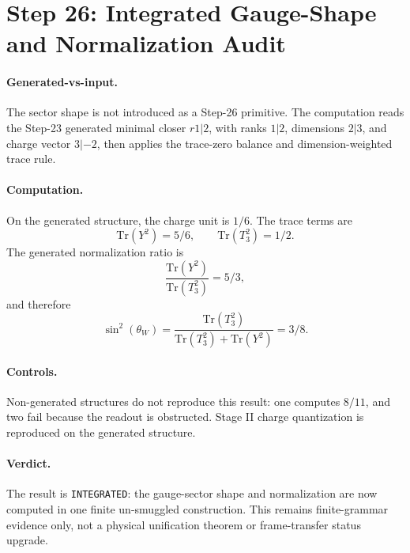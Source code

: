 \section{Step 26: Integrated Gauge-Shape and Normalization Audit}

\paragraph{Generated-vs-input.}
The sector shape is not introduced as a Step-26 primitive. The computation reads the Step-23 generated minimal closer \(r1|2\), with ranks \(1|2\), dimensions \(2|3\), and charge vector \(3|-2\), then applies the trace-zero balance and dimension-weighted trace rule.

\paragraph{Computation.}
On the generated structure, the charge unit is \(1/6\). The trace terms are
\[
\mathrm{Tr}(Y^2)=5/6,\qquad \mathrm{Tr}(T_3^2)=1/2.
\]
The generated normalization ratio is
\[
\frac{\mathrm{Tr}(Y^2)}{\mathrm{Tr}(T_3^2)}=5/3,
\]
and therefore
\[
\sin^2(\theta_W)=\frac{\mathrm{Tr}(T_3^2)}{\mathrm{Tr}(T_3^2)+\mathrm{Tr}(Y^2)}=3/8.
\]

\paragraph{Controls.}
Non-generated structures do not reproduce this result: one computes \(8/11\), and two fail because the readout is obstructed. Stage II charge quantization is reproduced on the generated structure.

\paragraph{Verdict.}
The result is \texttt{INTEGRATED}: the gauge-sector shape and normalization are now computed in one finite un-smuggled construction. This remains finite-grammar evidence only, not a physical unification theorem or frame-transfer status upgrade.
